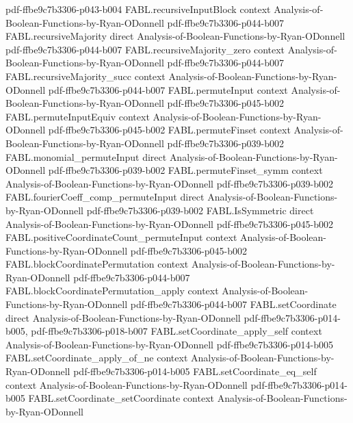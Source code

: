 \begin{theorem}
  {pdf-ffbe9c7b3306-p043-b004}
\proofstep
  {FABL.recursiveInputBlock}
  {context}
  {Analysis-of-Boolean-Functions-by-Ryan-ODonnell}
  {pdf-ffbe9c7b3306-p044-b007}
\proofstep
  {FABL.recursiveMajority}
  {direct}
  {Analysis-of-Boolean-Functions-by-Ryan-ODonnell}
  {pdf-ffbe9c7b3306-p044-b007}
\proofstep
  {FABL.recursiveMajority_zero}
  {context}
  {Analysis-of-Boolean-Functions-by-Ryan-ODonnell}
  {pdf-ffbe9c7b3306-p044-b007}
\proofstep
  {FABL.recursiveMajority_succ}
  {context}
  {Analysis-of-Boolean-Functions-by-Ryan-ODonnell}
  {pdf-ffbe9c7b3306-p044-b007}
\proofstep
  {FABL.permuteInput}
  {context}
  {Analysis-of-Boolean-Functions-by-Ryan-ODonnell}
  {pdf-ffbe9c7b3306-p045-b002}
\proofstep
  {FABL.permuteInputEquiv}
  {context}
  {Analysis-of-Boolean-Functions-by-Ryan-ODonnell}
  {pdf-ffbe9c7b3306-p045-b002}
\proofstep
  {FABL.permuteFinset}
  {context}
  {Analysis-of-Boolean-Functions-by-Ryan-ODonnell}
  {pdf-ffbe9c7b3306-p039-b002}
\proofstep
  {FABL.monomial_permuteInput}
  {direct}
  {Analysis-of-Boolean-Functions-by-Ryan-ODonnell}
  {pdf-ffbe9c7b3306-p039-b002}
\proofstep
  {FABL.permuteFinset_symm}
  {context}
  {Analysis-of-Boolean-Functions-by-Ryan-ODonnell}
  {pdf-ffbe9c7b3306-p039-b002}
\proofstep
  {FABL.fourierCoeff_comp_permuteInput}
  {direct}
  {Analysis-of-Boolean-Functions-by-Ryan-ODonnell}
  {pdf-ffbe9c7b3306-p039-b002}
\proofstep
  {FABL.IsSymmetric}
  {direct}
  {Analysis-of-Boolean-Functions-by-Ryan-ODonnell}
  {pdf-ffbe9c7b3306-p045-b002}
\proofstep
  {FABL.positiveCoordinateCount_permuteInput}
  {context}
  {Analysis-of-Boolean-Functions-by-Ryan-ODonnell}
  {pdf-ffbe9c7b3306-p045-b002}
\proofstep
  {FABL.blockCoordinatePermutation}
  {context}
  {Analysis-of-Boolean-Functions-by-Ryan-ODonnell}
  {pdf-ffbe9c7b3306-p044-b007}
\proofstep
  {FABL.blockCoordinatePermutation_apply}
  {context}
  {Analysis-of-Boolean-Functions-by-Ryan-ODonnell}
  {pdf-ffbe9c7b3306-p044-b007}
\proofstep
  {FABL.setCoordinate}
  {direct}
  {Analysis-of-Boolean-Functions-by-Ryan-ODonnell}
  {pdf-ffbe9c7b3306-p014-b005,
    pdf-ffbe9c7b3306-p018-b007}
\proofstep
  {FABL.setCoordinate_apply_self}
  {context}
  {Analysis-of-Boolean-Functions-by-Ryan-ODonnell}
  {pdf-ffbe9c7b3306-p014-b005}
\proofstep
  {FABL.setCoordinate_apply_of_ne}
  {context}
  {Analysis-of-Boolean-Functions-by-Ryan-ODonnell}
  {pdf-ffbe9c7b3306-p014-b005}
\proofstep
  {FABL.setCoordinate_eq_self}
  {context}
  {Analysis-of-Boolean-Functions-by-Ryan-ODonnell}
  {pdf-ffbe9c7b3306-p014-b005}
\proofstep
  {FABL.setCoordinate_setCoordinate}
  {context}
  {Analysis-of-Boolean-Functions-by-Ryan-ODonnell}

\end{theorem}
